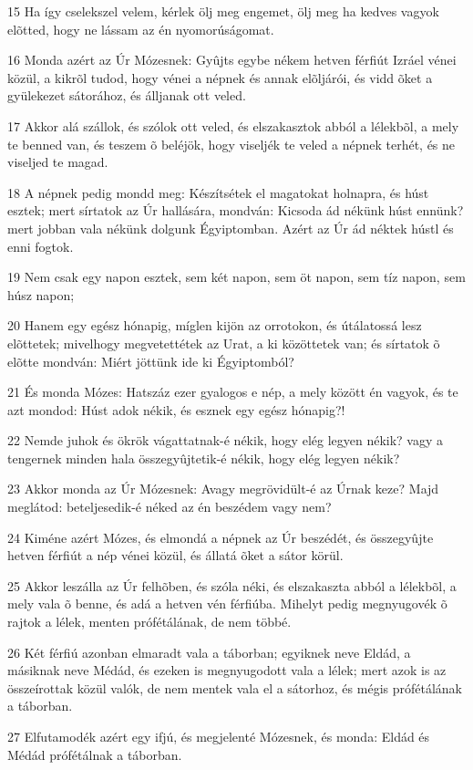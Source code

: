 \par 15 Ha így cselekszel velem, kérlek ölj meg engemet, ölj meg ha kedves vagyok elõtted, hogy ne lássam az én nyomorúságomat.
\par 16 Monda azért az Úr Mózesnek: Gyûjts egybe nékem hetven férfiút Izráel vénei közül, a kikrõl tudod, hogy vénei a népnek és annak elõljárói, és vidd õket a gyülekezet sátorához, és álljanak ott veled.
\par 17 Akkor alá szállok, és szólok ott veled, és elszakasztok abból a lélekbõl, a mely te benned van, és teszem õ beléjök, hogy viseljék te veled a népnek terhét, és ne viseljed te magad.
\par 18 A népnek pedig mondd meg: Készítsétek el magatokat holnapra, és húst esztek; mert sírtatok az Úr hallására, mondván: Kicsoda ád nékünk húst ennünk? mert jobban vala nékünk dolgunk Égyiptomban. Azért az Úr ád néktek hústl és enni fogtok.
\par 19 Nem csak egy napon esztek, sem két napon, sem öt napon, sem tíz napon, sem húsz napon;
\par 20 Hanem egy egész hónapig, míglen kijön az orrotokon, és útálatossá lesz elõttetek; mivelhogy megvetettétek az Urat, a ki közöttetek van; és sírtatok õ elõtte mondván: Miért jöttünk ide ki Égyiptomból?
\par 21 És monda Mózes: Hatszáz ezer gyalogos e nép, a mely között én vagyok, és te azt mondod: Húst adok nékik, és esznek egy egész hónapig?!
\par 22 Nemde juhok és ökrök vágattatnak-é nékik, hogy elég legyen nékik? vagy a tengernek minden hala összegyûjtetik-é nékik, hogy elég legyen nékik?
\par 23 Akkor monda az Úr Mózesnek: Avagy megrövidült-é az Úrnak keze? Majd meglátod: beteljesedik-é néked az én beszédem vagy nem?
\par 24 Kiméne azért Mózes, és elmondá a népnek az Úr beszédét, és összegyûjte hetven férfiút a nép vénei közül, és állatá õket a sátor körül.
\par 25 Akkor leszálla az Úr felhõben, és szóla néki, és elszakaszta abból a lélekbõl, a mely vala õ benne, és adá a hetven vén férfiúba. Mihelyt pedig megnyugovék õ rajtok a lélek, menten prófétálának, de nem többé.
\par 26 Két férfiú azonban elmaradt vala a táborban; egyiknek neve Eldád, a másiknak neve Médád, és ezeken is megnyugodott vala a lélek; mert azok is az összeírottak közül valók, de nem mentek vala el a sátorhoz, és mégis prófétálának a táborban.
\par 27 Elfutamodék azért egy ifjú, és megjelenté Mózesnek, és monda: Eldád és Médád prófétálnak a táborban.
